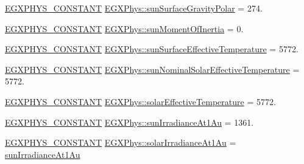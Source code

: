 \begin{DoxyCompactItemize}
\item 
\mbox{\hyperlink{group___e_g_x_phys-_constants-_macros_ga76980d288494ce1714c9ac68a95ba702}{E\+G\+X\+P\+H\+Y\+S\+\_\+\+C\+O\+N\+S\+T\+A\+NT}} \mbox{\hyperlink{group___e_g_x_phys-_constants-_astrophysics-_solar_system-_sun-_bulk_gae9187886dbbd7298e5a1d257a2365e9f}{E\+G\+X\+Phys\+::sun\+Surface\+Gravity\+Polar}} = 274.
\item 
\mbox{\hyperlink{group___e_g_x_phys-_constants-_macros_ga76980d288494ce1714c9ac68a95ba702}{E\+G\+X\+P\+H\+Y\+S\+\_\+\+C\+O\+N\+S\+T\+A\+NT}} \mbox{\hyperlink{group___e_g_x_phys-_constants-_astrophysics-_solar_system-_sun-_bulk_gaac9b36e0707bb136df37facc3629400a}{E\+G\+X\+Phys\+::sun\+Moment\+Of\+Inertia}} = 0.
\item 
\mbox{\hyperlink{group___e_g_x_phys-_constants-_macros_ga76980d288494ce1714c9ac68a95ba702}{E\+G\+X\+P\+H\+Y\+S\+\_\+\+C\+O\+N\+S\+T\+A\+NT}} \mbox{\hyperlink{group___e_g_x_phys-_constants-_astrophysics-_solar_system-_sun-_bulk_gac4f767d22333fd9a17ddd59e37d03545}{E\+G\+X\+Phys\+::sun\+Surface\+Effective\+Temperature}} = 5772.
\item 
\mbox{\hyperlink{group___e_g_x_phys-_constants-_macros_ga76980d288494ce1714c9ac68a95ba702}{E\+G\+X\+P\+H\+Y\+S\+\_\+\+C\+O\+N\+S\+T\+A\+NT}} \mbox{\hyperlink{group___e_g_x_phys-_constants-_astrophysics-_solar_system-_sun-_bulk_ga02d8f3c8e91bba017bcc609a4c743ae5}{E\+G\+X\+Phys\+::sun\+Nominal\+Solar\+Effective\+Temperature}} = 5772.
\item 
\mbox{\hyperlink{group___e_g_x_phys-_constants-_macros_ga76980d288494ce1714c9ac68a95ba702}{E\+G\+X\+P\+H\+Y\+S\+\_\+\+C\+O\+N\+S\+T\+A\+NT}} \mbox{\hyperlink{group___e_g_x_phys-_constants-_astrophysics-_solar_system-_sun-_bulk_gaa1a1a67eb8247ed92dc7869afbcfbdc3}{E\+G\+X\+Phys\+::solar\+Effective\+Temperature}} = 5772.
\item 
\mbox{\hyperlink{group___e_g_x_phys-_constants-_macros_ga76980d288494ce1714c9ac68a95ba702}{E\+G\+X\+P\+H\+Y\+S\+\_\+\+C\+O\+N\+S\+T\+A\+NT}} \mbox{\hyperlink{group___e_g_x_phys-_constants-_astrophysics-_solar_system-_sun-_bulk_ga7632e3eda212f81ae257daab783a1a3f}{E\+G\+X\+Phys\+::sun\+Irradiance\+At1\+Au}} = 1361.
\item 
\mbox{\hyperlink{group___e_g_x_phys-_constants-_macros_ga76980d288494ce1714c9ac68a95ba702}{E\+G\+X\+P\+H\+Y\+S\+\_\+\+C\+O\+N\+S\+T\+A\+NT}} \mbox{\hyperlink{group___e_g_x_phys-_constants-_astrophysics-_solar_system-_sun-_bulk_ga4ed5c970359ffccba0d45fc95541b332}{E\+G\+X\+Phys\+::solar\+Irradiance\+At1\+Au}} = \mbox{\hyperlink{group___e_g_x_phys-_constants-_astrophysics-_solar_system-_sun-_bulk_ga7632e3eda212f81ae257daab783a1a3f}{sun\+Irradiance\+At1\+Au}}

\end{DoxyCompactItemize}
